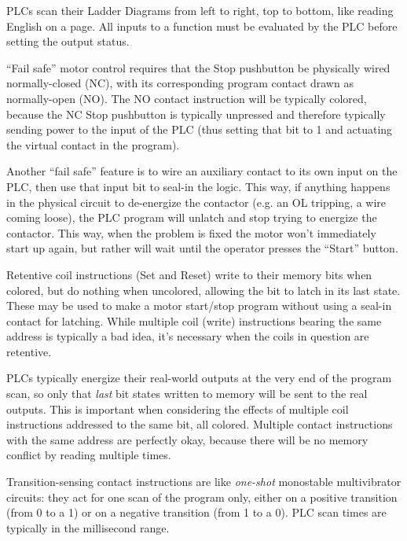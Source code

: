 \vskip 10pt

PLCs scan their Ladder Diagrams from left to right, top to bottom, like reading English on a page.  All inputs to a function must be evaluated by the PLC before setting the output status.

\vskip 10pt

``Fail safe'' motor control requires that the Stop pushbutton be physically wired normally-closed (NC), with its corresponding program contact drawn as normally-open (NO).  The NO contact instruction will be typically colored, because the NC Stop pushbutton is typically unpressed and therefore typically sending power to the input of the PLC (thus setting that bit to 1 and actuating the virtual contact in the program).

\vskip 10pt

Another ``fail safe'' feature is to wire an auxiliary contact to its own input on the PLC, then use that input bit to seal-in the logic.  This way, if anything happens in the physical circuit to de-energize the contactor (e.g. an OL tripping, a wire coming loose), the PLC program will unlatch and stop trying to energize the contactor.  This way, when the problem is fixed the motor won't immediately start up again, but rather will wait until the operator presses the ``Start'' button.

\vskip 10pt

Retentive coil instructions (Set and Reset) write to their memory bits when colored, but do nothing when uncolored, allowing the bit to latch in its last state.  These may be used to make a motor start/stop program without using a seal-in contact for latching.  While multiple coil (write) instructions bearing the same address is typically a bad idea, it's necessary when the coils in question are retentive.

PLCs typically energize their real-world outputs at the very end of the program scan, so only that {\it last} bit states written to memory will be sent to the real outputs.  This is important when considering the effects of multiple coil instructions addressed to the same bit, all colored.  Multiple contact instructions with the same address are perfectly okay, because there will be no memory conflict by reading multiple times.

\vskip 10pt

Transition-sensing contact instructions are like {\it one-shot} monostable multivibrator circuits: they act for one scan of the program only, either on a positive transition (from 0 to a 1) or on a negative transition (from 1 to a 0).  PLC scan times are typically in the millisecond range.















